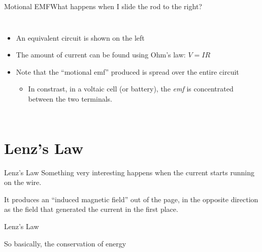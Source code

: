 \documentclass[12pt,aspectratio=169]{beamer}
\begin{document}
\begin{frame}{Motional EMF}{What happens when I slide the rod to the right?}
  \begin{columns}
    
    \begin{itemize}
    \item An equivalent circuit is shown on the left
    \item The amount of current can be found using Ohm's law: $V=IR$
    \item Note that the ``motional emf'' produced is spread over the entire
      circuit
      \begin{itemize}
      \item In constrast, in a voltaic cell (or battery), the \emph{emf} is
        concentrated between the two terminals.
      \end{itemize}
    \end{itemize}
  \end{columns}
\end{frame}



\section{Lenz's Law}

\begin{frame}{Lenz's Law}
  Something very interesting happens when the current starts running on the
  wire.
  \begin{center}
  \end{center}
  It produces an ``induced magnetic field'' out of the page, in the opposite
  direction as the field that generated the current in the first place.
\end{frame}



\begin{frame}{Lenz's Law}
  \begin{center}
  \end{center}
  So basically, the conservation of energy
\end{frame}
\end{document}
